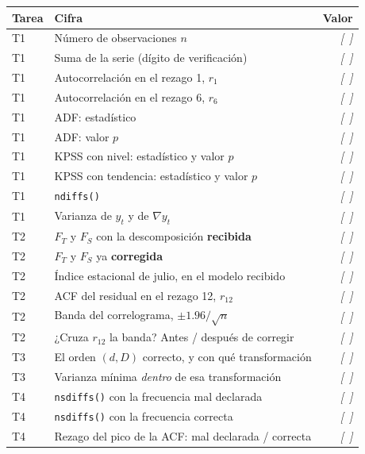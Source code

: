 \documentclass[11pt,a4paper,oneside]{article}
\newcommand{\marcador}[1]{\textcolor{grismarcador}{\textit{[#1]}}}
\begin{document}
\vspace{0.3cm}
\renewcommand{\arraystretch}{1.25}
\begingroup\setlength{\parskip}{0pt}
\begin{tabularx}{\textwidth}{@{}l X r@{}}
\toprule
\textbf{Tarea} & \textbf{Cifra} & \textbf{Valor} \\
\midrule
T1 & Número de observaciones $n$                             & \marcador{~} \\
T1 & Suma de la serie (dígito de verificación)               & \marcador{~} \\
T1 & Autocorrelación en el rezago 1, $r_1$                   & \marcador{~} \\
T1 & Autocorrelación en el rezago 6, $r_6$                   & \marcador{~} \\
T1 & ADF: estadístico                                        & \marcador{~} \\
T1 & ADF: valor $p$                                          & \marcador{~} \\
T1 & KPSS con nivel: estadístico y valor $p$                 & \marcador{~} \\
T1 & KPSS con tendencia: estadístico y valor $p$             & \marcador{~} \\
T1 & \texttt{ndiffs()}                                       & \marcador{~} \\
T1 & Varianza de $y_t$ y de $\nabla y_t$                     & \marcador{~} \\
\midrule
T2 & $F_T$ y $F_S$ con la descomposición \textbf{recibida}   & \marcador{~} \\
T2 & $F_T$ y $F_S$ ya \textbf{corregida}                     & \marcador{~} \\
T2 & Índice estacional de julio, en el modelo recibido       & \marcador{~} \\
T2 & ACF del residual en el rezago 12, $r_{12}$              & \marcador{~} \\
T2 & Banda del correlograma, $\pm 1.96/\sqrt{n}$             & \marcador{~} \\
T2 & ¿Cruza $r_{12}$ la banda? Antes / después de corregir   & \marcador{~} \\
\midrule
T3 & El orden $(d, D)$ correcto, y con qué transformación     & \marcador{~} \\
T3 & Varianza mínima \emph{dentro} de esa transformación     & \marcador{~} \\
\midrule
T4 & \texttt{nsdiffs()} con la frecuencia mal declarada      & \marcador{~} \\
T4 & \texttt{nsdiffs()} con la frecuencia correcta           & \marcador{~} \\
T4 & Rezago del pico de la ACF: mal declarada / correcta     & \marcador{~} \\
\bottomrule
\end{tabularx}
\endgroup
\end{document}
